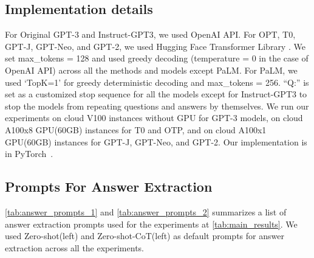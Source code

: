 \documentclass{article}
\newcommand{\ours}{Zero-shot-CoT\xspace}
\newcommand{\theirsz}{Zero-shot\xspace}
\begin{document}
\subsection{Implementation details}
For Original GPT-3 and Instruct-GPT3, we used OpenAI API. 
For OPT, T0, GPT-J, GPT-Neo, and GPT-2, we used Hugging Face Transformer Library \citep{huggingface}.
We set max\_tokens = 128 and used greedy decoding (temperature = 0 in the case of OpenAI API) across all the methods and models except PaLM.
For PaLM, we used `TopK=1' for greedy deterministic decoding and max\_tokens = 256.
``Q:'' is set as a customized stop sequence for all the models except for Instruct-GPT3 to stop the models from repeating questions and answers by themselves.
We run our experiments on cloud V100 instances without GPU for GPT-3 models, on cloud A100x8 GPU(60GB) instances for T0 and OTP, and on cloud A100x1 GPU(60GB) instances for GPT-J, GPT-Neo, and GPT-2. Our implementation is in PyTorch~\citep{paszke2019pytorch}.

\subsection{Prompts For Answer Extraction}
\label{appx:answer_prompts}

\autoref{tab:answer_prompts_1} and \autoref{tab:answer_prompts_2} summarizes a list of answer extraction prompts used for the experiments at \autoref{tab:main_results}. 
We used \theirsz (left) and \ours (left) as default prompts for answer extraction across all the experiments.
\end{document}
